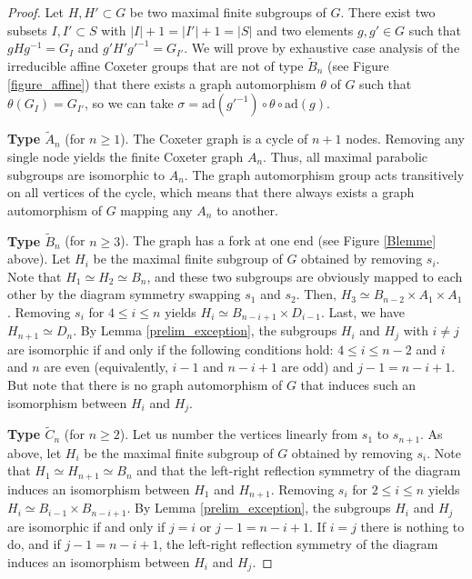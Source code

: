 \documentclass[a4paper, 11pt]{amsart}
\theoremstyle{definition}
\theoremstyle{remark}
\renewcommand{\leq}{\leqslant}
\renewcommand{\geq}{\geqslant}
\begin{document}
\begin{proof}Let $H,H'\subset G$ be two maximal finite subgroups of $G$. There exist two subsets $I,I'\subset S$ with $\vert I\vert +1=\vert I'\vert +1=\vert S\vert$ and two elements $g,g'\in G$ such that $gHg^{-1}=G_I$ and $g'H'g'^{-1}=G_{I'}$. We will prove by exhaustive case analysis of the irreducible affine Coxeter groups that are not of type $\tilde{B}_n$ (see Figure \ref{figure_affine}) that there exists a graph automorphism $\theta$ of $G$ such that $\theta(G_I)=G_{I'}$, so we can take $\sigma=\mathrm{ad}(g'^{-1})\circ \theta \circ \mathrm{ad}(g)$.

\smallskip

\textbf{Type $\tilde{A}_n$} (for $n\geq 1$). The Coxeter graph is a cycle of $n+1$ nodes. Removing any single node yields the finite Coxeter graph $A_n$. Thus, all maximal parabolic subgroups are isomorphic to $A_n$. The graph automorphism group acts transitively on all vertices of the cycle, which means that there always exists a graph automorphism of $G$ mapping any $A_n$ to another.

\smallskip


\textbf{Type $\tilde{B}_n$} (for $n\geq 3$). The graph has a fork at one end (see Figure \ref{Blemme} above). Let $H_i$ be the maximal finite subgroup of $G$ obtained by removing $s_i$. Note that $H_1\simeq H_2\simeq B_n$, and these two subgroups are obviously mapped to each other by the diagram symmetry swapping $s_1$ and $s_2$. Then, $H_3\simeq B_{n-2}\times A_1\times A_1$. Removing $s_i$ for $4\leq i\leq n$ yields $H_i\simeq B_{n-i+1}\times D_{i-1}$. Last, we have $H_{n+1}\simeq D_n$. By Lemma \ref{prelim_exception}, the subgroups $H_i$ and $H_j$ with $i\neq j$ are isomorphic if and only if the following conditions hold: $4\leq i\leq n-2$ and $i$ and $n$ are even (equivalently, $i-1$ and $n-i+1$ are odd) and $j-1=n-i+1$. But note that there is no graph automorphism of $G$ that induces such an isomorphism between $H_i$ and $H_j$. 

\smallskip

\textbf{Type $\tilde{C}_n$} (for $n\geq 2$). Let us number the vertices linearly from $s_1$ to $s_{n+1}$. As above, let $H_i$ be the maximal finite subgroup of $G$ obtained by removing $s_i$. Note that $H_1\simeq H_{n+1}\simeq B_n$ and that the left-right reflection symmetry of the diagram induces an isomorphism between $H_1$ and $H_{n+1}$. Removing $s_i$ for $2\leq i\leq n$ yields $H_i\simeq B_{i-1} \times B_{n-i+1}$. By Lemma \ref{prelim_exception}, the subgroups $H_i$ and $H_j$ are isomorphic if and only if $j = i$ or $j-1 = n-i+1$. If $i=j$ there is nothing to do, and if $j-1 = n-i+1$, the left-right reflection symmetry of the diagram induces an isomorphism between $H_i$ and $H_j$.


\end{proof}
\end{document}
